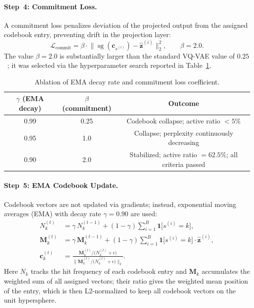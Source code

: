 \documentclass{article}
\begin{document}
\paragraph{Step~4: Commitment Loss.}
A commitment loss penalizes deviation of the projected output from the assigned
codebook entry, preventing drift in the projection layer:
%
\begin{equation}
  \mathcal{L}_{\text{commit}}
  = \beta \cdot
    \bigl\|\operatorname{sg}(\mathbf{c}_{s^{(i)}})
           - \hat{\mathbf{z}}^{(i)}\bigr\|_2^2,
  \qquad \beta = 2.0.
\end{equation}
%
The value $\beta = 2.0$ is substantially larger than the standard VQ-VAE value
of $0.25$~\cite{vandenoord2017vqvae}; it was selected via the hyperparameter search
reported in Table~\ref{tab:ablation}.

\begin{table}[H]
\centering
\caption{Ablation of EMA decay rate and commitment loss coefficient.}
\label{tab:ablation}
\begin{tabular}{ccc}
\toprule
$\gamma$ (EMA decay) & $\beta$ (commitment) & Outcome \\
\midrule
0.99 & 0.25 & Codebook collapse; active ratio $< 5\%$ \\
0.95 & 1.0  & Collapse; perplexity continuously decreasing \\
0.90 & 2.0  & Stabilized; active ratio $= 62.5\%$; all criteria passed \\
\bottomrule
\end{tabular}
\end{table}

\paragraph{Step~5: EMA Codebook Update.}
Codebook vectors are not updated via gradients; instead, exponential moving
averages (EMA) with decay rate $\gamma = 0.90$ are used:
%
\begin{align}
  N_k^{(t)}
  &= \gamma\,N_k^{(t-1)}
   + (1-\gamma)\sum_{i=1}^{B}\mathbf{1}\bigl[s^{(i)}=k\bigr], \\[4pt]
  \mathbf{M}_k^{(t)}
  &= \gamma\,\mathbf{M}_k^{(t-1)}
   + (1-\gamma)\sum_{i=1}^{B}\mathbf{1}\bigl[s^{(i)}=k\bigr]
     \cdot\hat{\mathbf{z}}^{(i)}, \\[4pt]
  \mathbf{c}_k^{(t)}
  &= \frac{\mathbf{M}_k^{(t)}/\bigl(N_k^{(t)}+\epsilon\bigr)}
          {\bigl\|\mathbf{M}_k^{(t)}/\bigl(N_k^{(t)}+\epsilon\bigr)\bigr\|_2}.
\end{align}
%
Here $N_k$ tracks the hit frequency of each codebook entry and $\mathbf{M}_k$
accumulates the weighted sum of all assigned vectors; their ratio gives the
weighted mean position of the entry, which is then L2-normalized to keep all
codebook vectors on the unit hypersphere.
\end{document}
